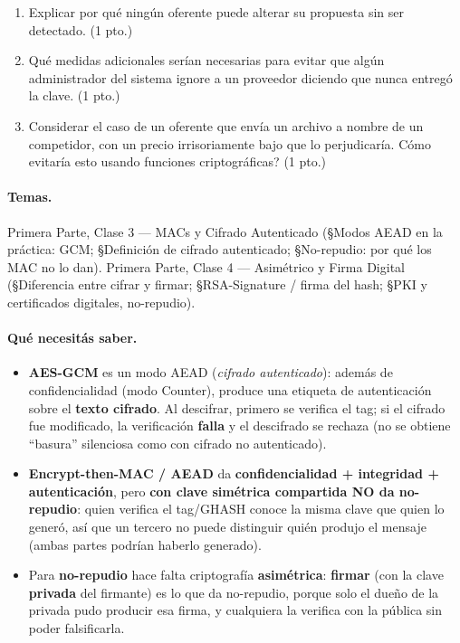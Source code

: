 \begin{consigna}
\begin{enumerate}
  \item[a)] Explicar por qué ningún oferente puede alterar su propuesta sin ser detectado.
  (1 pto.)
  \item[b)] Qué medidas adicionales serían necesarias para evitar que algún administrador
  del sistema ignore a un proveedor diciendo que nunca entregó la clave. (1 pto.)
  \item[c)] Considerar el caso de un oferente que envía un archivo a nombre de un competidor,
  con un precio irrisoriamente bajo que lo perjudicaría. \textquestiondown{}Cómo evitaría esto usando funciones
  criptográficas? (1 pto.)
\end{enumerate}
\end{consigna}

\paragraph{Temas.}
Primera Parte, Clase 3 --- MACs y Cifrado Autenticado (\S Modos AEAD en la práctica: GCM;
\S Definición de cifrado autenticado; \S No-repudio: por qué los MAC no lo dan). Primera
Parte, Clase 4 --- Asimétrico y Firma Digital (\S Diferencia entre cifrar y firmar;
\S RSA-Signature / firma del hash; \S PKI y certificados digitales, no-repudio).

\paragraph{Qué necesitás saber.}
\begin{itemize}
  \item \textbf{AES-GCM} es un modo AEAD (\emph{cifrado autenticado}): además de
  confidencialidad (modo Counter), produce una etiqueta de autenticación sobre el
  \textbf{texto cifrado}. Al descifrar, primero se verifica el tag; si el cifrado fue
  modificado, la verificación \textbf{falla} y el descifrado se rechaza (no se obtiene
  ``basura'' silenciosa como con cifrado no autenticado).
  \item \textbf{Encrypt-then-MAC / AEAD} da \textbf{confidencialidad + integridad +
  autenticación}, pero \textbf{con clave simétrica compartida NO da no-repudio}: quien
  verifica el tag/GHASH conoce la misma clave que quien lo generó, así que un tercero
  no puede distinguir quién produjo el mensaje (ambas partes podrían haberlo generado).
  \item Para \textbf{no-repudio} hace falta criptografía \textbf{asimétrica}: \textbf{firmar}
  (con la clave \textbf{privada} del firmante) es lo que da no-repudio, porque solo el dueño
  de la privada pudo producir esa firma, y cualquiera la verifica con la pública sin poder
  falsificarla.
\end{itemize}


